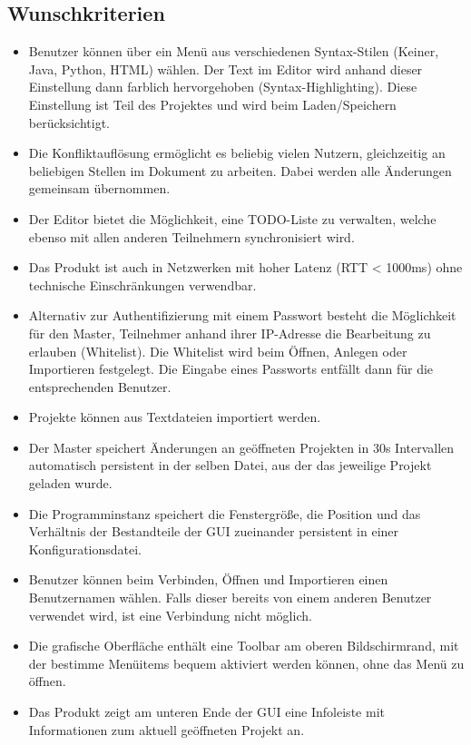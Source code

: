 \documentclass{scrartcl}
\begin{document}
\subsection{Wunschkriterien}
\begin{itemize}
\item Benutzer können über ein Menü aus verschiedenen Syntax-Stilen (Keiner, Java, Python, HTML) wählen. Der Text im Editor wird anhand dieser Einstellung dann farblich hervorgehoben (Syntax-Highlighting). Diese Einstellung ist Teil des Projektes und wird beim Laden/Speichern berücksichtigt.
\item Die Konfliktauflösung ermöglicht es beliebig vielen Nutzern, gleichzeitig an beliebigen Stellen im Dokument zu arbeiten. Dabei werden alle Änderungen gemeinsam übernommen.
\item Der Editor bietet die Möglichkeit, eine TODO-Liste zu verwalten, welche ebenso mit allen anderen Teilnehmern synchronisiert wird.
\item Das Produkt ist auch in Netzwerken mit hoher Latenz (RTT < 1000ms) ohne technische Einschränkungen verwendbar. 
\item Alternativ zur Authentifizierung mit einem Passwort besteht die Möglichkeit für den Master, Teilnehmer anhand ihrer IP-Adresse die Bearbeitung zu erlauben (Whitelist). Die Whitelist wird beim Öffnen, Anlegen oder Importieren festgelegt. Die Eingabe eines Passworts entfällt dann für die entsprechenden Benutzer.
\item Projekte können aus Textdateien importiert werden. 
\item Der Master speichert Änderungen an geöffneten Projekten in 30s Intervallen automatisch persistent in der selben Datei, aus der das jeweilige Projekt geladen wurde.
\item Die Programminstanz speichert die Fenstergröße, die Position und das Verhältnis der Bestandteile der GUI zueinander persistent in einer Konfigurationsdatei.
\item Benutzer können beim Verbinden, Öffnen und Importieren einen Benutzernamen wählen. Falls dieser bereits von einem anderen Benutzer verwendet wird, ist eine Verbindung nicht möglich.
\item Die grafische Oberfläche enthält eine Toolbar am oberen Bildschirmrand, mit der bestimme Menüitems bequem aktiviert werden können, ohne das Menü zu öffnen.
\item Das Produkt zeigt am unteren Ende der GUI eine Infoleiste mit Informationen zum aktuell geöffneten Projekt an.
\end{itemize}
\end{document}
